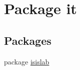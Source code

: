 \hypertarget{namespaceit}{\section{Package it}
\label{namespaceit}
}
\subsection*{Packages}
\begin{DoxyCompactItemize}
\item 
package \hyperlink{namespaceit_1_1isislab}{isislab}
\end{DoxyCompactItemize}
